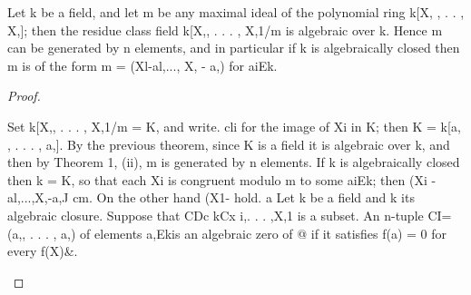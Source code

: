 \begin{theorem}[Theorem 5.3]\label{mcrt-auto-theorem-5-3}\uses{}
\begin{mathematicalrecord}
Let k be a field, and let m be any maximal ideal of the
   polynomial ring k[X, , . . , X,]; then the residue class field k[X,, . . . , X,1/m
   is algebraic over k. Hence m can be generated by n elements, and in
   particular if k is algebraically closed then m is of the form m =
   (Xl-al,...,       X, - a,) for aiEk.
\end{mathematicalrecord}
\end{theorem}
\begin{proof}
\begin{mathematicalrecord}
Set k[X,, . . . , X,1/m = K, and write. cli for the image of Xi in K; then
   K = k[a, , . . . , a,]. By the previous theorem, since K is a field it is algebraic
   over k, and then by Theorem 1, (ii), m is generated by n elements. If k is
   algebraically closed then k = K, so that each Xi is congruent modulo m to
   some aiEk; then (Xi -al,...,X,-a,J               cm.     On the other hand
   (X1-%
   hold. a
     Let k be a field and k its algebraic closure. Suppose that CDc
   kCx i,. . . ,X,1 is a subset. An n-tuple CI= (a,, . . . , a,) of elements a,Ekis an
   algebraic zero of @ if it satisfies f(a) = 0 for every f(X)&.
\end{mathematicalrecord}
\end{proof}


